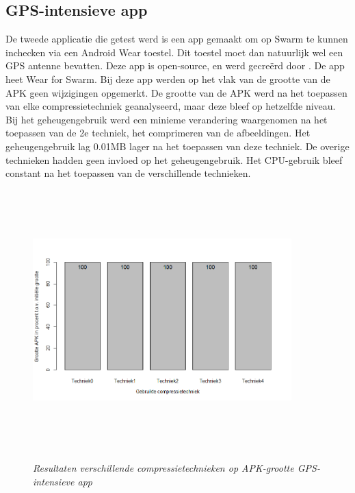 \subsection{GPS-intensieve app}
De tweede applicatie die getest werd is een app gemaakt om op Swarm te kunnen inchecken via een Android Wear toestel. Dit toestel moet dan natuurlijk wel een GPS antenne bevatten. Deze app is open-source, en werd gecreërd door \autocite{wearswarm}. De app heet Wear for Swarm.
Bij deze app werden op het vlak van de grootte van de APK geen wijzigingen opgemerkt. De grootte van de APK werd na het toepassen van elke compressietechniek geanalyseerd, maar deze bleef op hetzelfde niveau. Bij het geheugengebruik werd een minieme verandering waargenomen na het toepassen van de 2e techniek, het comprimeren van de afbeeldingen. Het geheugengebruik lag 0.01MB lager na het toepassen van deze techniek. De overige technieken hadden geen invloed op het geheugengebruik. Het CPU-gebruik bleef constant na het toepassen van de verschillende technieken.
\begin{figure}[H]
	\centering
	\caption{\textit{Resultaten verschillende compressietechnieken op APK-grootte GPS-intensieve app}}
	\includegraphics[width=10cm, height=10cm, keepaspectratio]{img/Rplot02}\\[.5cm]
	
\end{figure}
